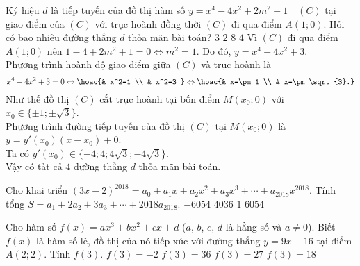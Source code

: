 \begin{ex}%
	Ký hiệu $d$ là tiếp tuyến  của đồ thị hàm số $y = x^4 - 4x^2 + 2m^2 + 1\quad (C)$ tại giao điểm của $(C)$ với trục hoành đồng thời $(C)$ đi qua điểm $A(1; 0)$. Hỏi có bao nhiêu đường thẳng $d$ thỏa mãn bài toán?
	\choice
	{$3$}
	{$2$}
	{$8$}
	{\True $4$}
	\loigiai
	{Vì $(C)$ đi qua điểm $A(1; 0)$ nên $1-4+2m^2+1=0\Leftrightarrow m^2=1$. Do đó, $y=x^4-4x^2+3$.\\
	Phương trình hoành độ giao điểm giữa $(C)$ và trục hoành là $$x^4-4x^2+3=0\Leftrightarrow\hoac{& x^2=1 \\ & x^2=3 }\Leftrightarrow\hoac{& x=\pm 1 \\ & x=\pm \sqrt{3}.}$$
	Như thế đồ thị $(C)$ cắt trục hoành tại bốn điểm $M(x_0; 0)$ với $x_0\in\{\pm 1; \pm \sqrt{3}\}$.\\
	Phương trình đường tiếp tuyến của đồ thị $(C)$ tại $M(x_0;0)$ là $y=y'\left(x_0\right)(x-x_0)+0$.\\
	Ta có $y'\left(x_0\right)\in \{-4; 4; 4\sqrt{3}; -4\sqrt{3}\}$.\\
	Vậy có tất cả $4$ đường thẳng $d$ thỏa mãn bài toán.
	}
\end{ex}%
\begin{ex}%
	Cho khai triển $ (3x-2)^{2018}=a_0+a_1x+a_2x^2+a_3x^3+\cdots+a_{2018}x^{2018} $. Tính tổng $ S=a_1+2a_2+3a_3+\cdots+2018a_{2018} $.
	\choice
	{$ -6054 $}
	{$  4036 $}
	{$  1$}
	{\True $  6054$}
\end{ex}%
\begin{ex}%
	Cho hàm số $f(x)=ax^3+bx^2+cx+d$ ($a$, $b$, $c$, $d$ là hằng số và $ a\ne 0 $). Biết $f(x)$ là hàm số lẻ, đồ thị của nó tiếp xúc với đường thẳng $y=9x-16$ tại điểm $A(2;2)$. Tính $f(3)$.
	\choice
	{$f(3)=-2$}
	{$f(3)=36$}
	{$f(3)=27$}
	{\True $f(3)=18$}
\end{ex}%
